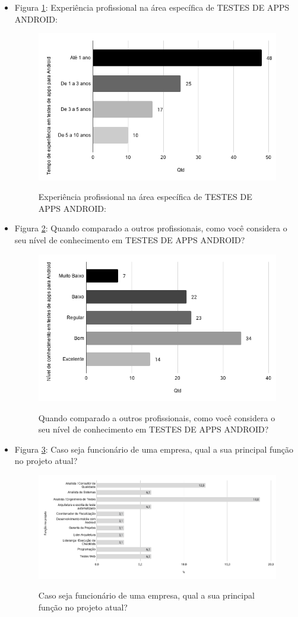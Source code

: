 \begin{itemize}
    \item Figura \ref{figure:s_experienciatestesandroid}: Experiência profissional na área específica de TESTES DE APPS ANDROID:
    \begin{figure}[!htb]
    \centering
    \includegraphics[width=.55\textwidth]{images/s_experienciatestesandroid.png}
    \label{figure:s_experienciatestesandroid}
    \caption{Experiência profissional na área específica de TESTES DE APPS ANDROID:}
    \end{figure}
    
    
     \item Figura \ref{figure:s_conhecimentotestesandroid}: Quando comparado a outros profissionais, como você considera o seu nível de conhecimento em TESTES DE APPS ANDROID?
    \begin{figure}[!htb]
    \centering
    \includegraphics[width=.55\textwidth]{images/s_conhecimentotestesandroid.png}
    \label{figure:s_conhecimentotestesandroid}
    \caption{Quando comparado a outros profissionais, como você considera o seu nível de conhecimento em TESTES DE APPS ANDROID?}
    \end{figure}   
    
    
    
    \item Figura \ref{figure:s_funcaoprojeto}: Caso seja funcionário de uma empresa, qual a sua principal função no projeto atual?
    \begin{figure}[!htb]
    \centering
    \includegraphics[width=.55\textwidth]{images/s_funcaoprojeto.png}
    \label{figure:s_funcaoprojeto}
    \caption{Caso seja funcionário de uma empresa, qual a sua principal função no projeto atual?}
    \end{figure}
    

\end{itemize}
